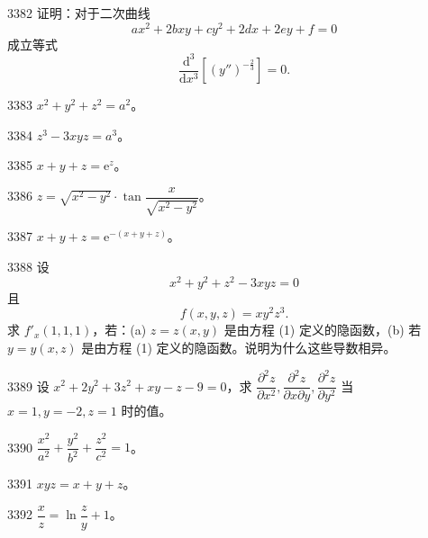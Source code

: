 \begin{prob}[M]{3382}
证明：对于二次曲线
\[
ax^2 + 2bxy + cy^2 + 2dx + 2ey + f = 0
\]
成立等式
\[
\frac{\mathrm{d}^3}{\mathrm{d}x^3}\left[(y'')^{-\frac{2}{3}}\right] = 0.
\]
\end{prob}


\begin{prob}[S]{3383}
$x^2 + y^2 + z^2 = a^2$。
\end{prob}

\begin{prob}[S]{3384}
$z^3 - 3xyz = a^3$。
\end{prob}

\begin{prob}[S]{3385}
$x + y + z = \mathrm{e}^z$。
\end{prob}

\begin{prob}[S]{3386}
$z = \sqrt{x^2 - y^2}\cdot\tan\dfrac{x}{\sqrt{x^2 - y^2}}$。
\end{prob}

\begin{prob}[S]{3387}
$x + y + z = \mathrm{e}^{-(x + y + z)}$。
\end{prob}

\begin{prob}[M]{3388}
设
\[
x^2 + y^2 + z^2 - 3xyz = 0 \tag{1}
\]
且
\[
f(x, y, z) = xy^2 z^3.
\]
求 $f'_x(1, 1, 1)$，若：(a) $z = z(x, y)$ 是由方程 (1) 定义的隐函数，(b) 若 $y = y(x, z)$ 是由方程 (1) 定义的隐函数。说明为什么这些导数相异。
\end{prob}

\begin{prob}[M]{3389}
设 $x^2 + 2y^2 + 3z^2 + xy - z - 9 = 0$，求 $\dfrac{\partial^2 z}{\partial x^2}, \dfrac{\partial^2 z}{\partial x \partial y}, \dfrac{\partial^2 z}{\partial y^2}$ 当 $x = 1, y = -2, z = 1$ 时的值。
\end{prob}


\begin{prob}[S]{3390}
$\dfrac{x^2}{a^2} + \dfrac{y^2}{b^2} + \dfrac{z^2}{c^2} = 1$。
\end{prob}

\begin{prob}[S]{3391}
$xyz = x + y + z$。
\end{prob}

\begin{prob}[S]{3392}
$\dfrac{x}{z} = \ln\dfrac{z}{y} + 1$。
\end{prob}

